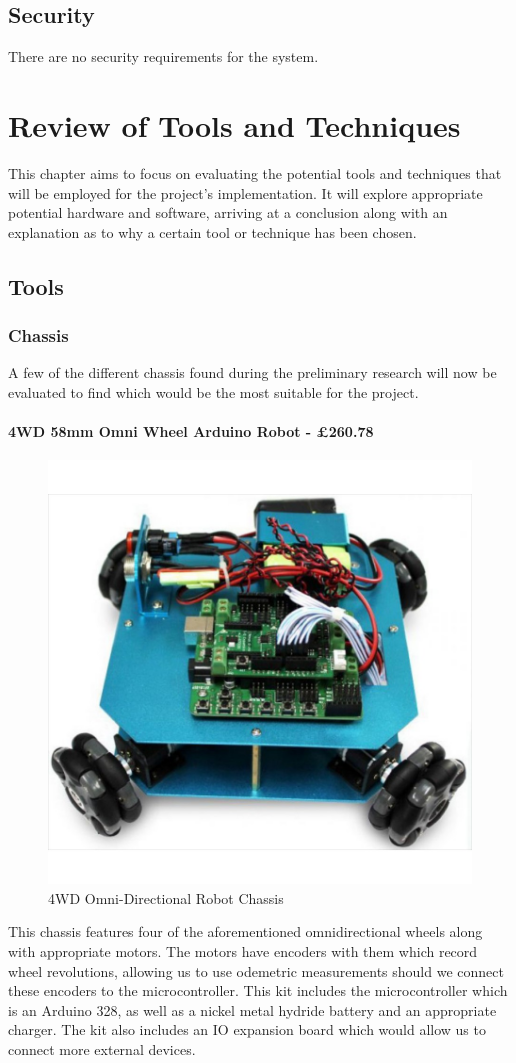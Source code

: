 			\section{Security}
			There are no security requirements for the system.
		
		\chapter{Review of Tools and Techniques}
		This chapter aims to focus on evaluating the potential tools and techniques that will be employed for the project's implementation. It will explore appropriate potential hardware and software, arriving at a conclusion along with an explanation as to why a certain tool or technique has been chosen.
			\section{Tools}
				\subsection{Chassis}
					A few of the different chassis found during the preliminary research will now be evaluated to find which would be the most suitable for the project.
					
					\subsubsection{4WD 58mm Omni Wheel Arduino Robot - \pounds{260.78}}
					\begin{figure}[h]
						\centering
						\includegraphics[width=.3\linewidth]{ANALYSIS/4wdomnidirectionalarduino.jpg}
						\caption{4WD Omni-Directional Robot Chassis}
						\label{4WD Omni-Directional Robot Chassis}
					\end{figure}
					This chassis features four of the aforementioned omnidirectional wheels along with appropriate motors. The motors have encoders with them which record wheel revolutions, allowing us to use odemetric measurements should we connect these encoders to the microcontroller. This kit includes the microcontroller which is an Arduino 328, as well as a nickel metal hydride battery and an appropriate charger. The kit also includes an IO expansion board which would allow us to connect more external devices\cite{4wdArduinoChassis}.
					
